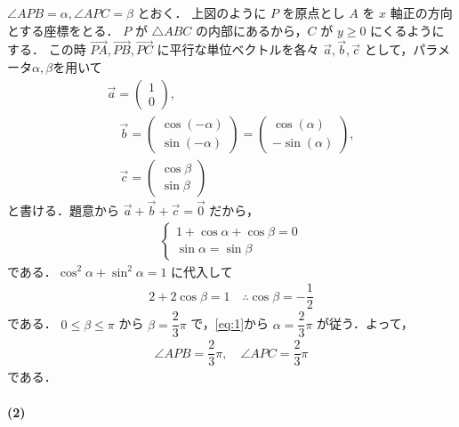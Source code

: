 \documentclass[../../main.tex]{subfiles}
\begin{document}
$\angle APB = \alpha, \angle APC = \beta$ とおく．
上図のように $P$ を原点とし $A$ を $x$ 軸正の方向とする座標をとる．
$P$ が $\triangle ABC$ の内部にあるから，$C$ が $y \ge 0$ にくるようにする．
この時 $\overrightarrow{PA}, \overrightarrow{PB}, \overrightarrow{PC}$ に平行な単位ベクトルを各々 $\vec{a}, \vec{b}, \vec{c}$ として，パラメータ$\alpha,\beta$を用いて
\begin{align}
  \vec{a} =
  \begin{pmatrix} 1 \\ 0
  \end{pmatrix}, \\
  \quad \vec{b} =
  \begin{pmatrix} \cos(-\alpha) \\ \sin(-\alpha)
  \end{pmatrix} =
  \begin{pmatrix} \cos(\alpha) \\ -\sin(\alpha)
  \end{pmatrix}, \\
  \quad \vec{c} =
  \begin{pmatrix} \cos\beta \\ \sin\beta
  \end{pmatrix}
\end{align}
と書ける．題意から $\vec{a} + \vec{b} + \vec{c} = \vec{0}$ だから，
\begin{align}
  \begin{cases}
    1 + \cos\alpha + \cos\beta = 0 \\
    \sin\alpha = \sin\beta
  \end{cases} \label{eq:1}
\end{align}
である．$\cos^2\alpha + \sin^2\alpha = 1$ に代入して
\begin{align}
  2 + 2\cos\beta = 1 \quad \therefore \cos\beta = -\dfrac{1}{2} \label{eq:2}
\end{align}
である．
$0 \le \beta \le \pi$ から $\beta = \dfrac{2}{3}\pi$ で，\cref{eq:1}から $\alpha = \dfrac{2}{3}\pi$ が従う．よって，
\begin{align}
  \angle APB = \dfrac{2}{3}\pi, \quad \angle APC = \dfrac{2}{3}\pi
\end{align}
である．

\paragraph{(2)}
\end{document}
